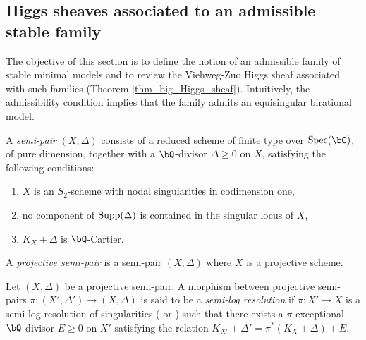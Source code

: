 \documentclass[11pt,letterpaper]{amsart}
\numberwithin{equation}{section}
\begin{document}
	\subsection{Higgs sheaves associated to an admissible stable family}\label{section_VZHiggs_stable_family}
	The objective of this section is to define the notion of an admissible family of stable minimal models and to review the Viehweg-Zuo Higgs sheaf associated with such families (Theorem \ref{thm_big_Higgs_sheaf}). Intuitively, the admissibility condition implies that the family admits an equisingular birational model.
	\begin{defn}\label{defn_semipair}
		A \emph{semi-pair} $(X, \Delta)$ consists of a reduced scheme of finite type over ${\rm Spec}(\bC)$, of pure dimension, together with a $\bQ$-divisor $\Delta\geq 0$ on $X$, satisfying the following conditions:  
		\begin{enumerate}  
			\item $X$ is an $S_2$-scheme with nodal singularities in codimension one,  
			\item no component of ${\rm Supp}(\Delta)$ is contained in the singular locus of $X$,  
			\item $K_X + \Delta$ is $\bQ$-Cartier.  
		\end{enumerate}  
		A \emph{projective semi-pair} is a semi-pair $(X, \Delta)$ where $X$ is a projective scheme.
	\end{defn}
	\begin{defn}
		Let $(X, \Delta)$ be a projective semi-pair. A morphism between projective semi-pairs $\pi: (X', \Delta') \to (X, \Delta)$ is said to be a \textit{semi-log resolution} if $\pi: X' \to X$ is a semi-log resolution of singularities (\cite{Bierstone2013} or \cite[\S 10.4]{Kollar2013}) such that there exists a $\pi$-exceptional $\bQ$-divisor $E \geq 0$ on $X'$ satisfying the relation $K_{X'} + \Delta' = \pi^{\ast}(K_X + \Delta) + E$.
	\end{defn}
\end{document}

